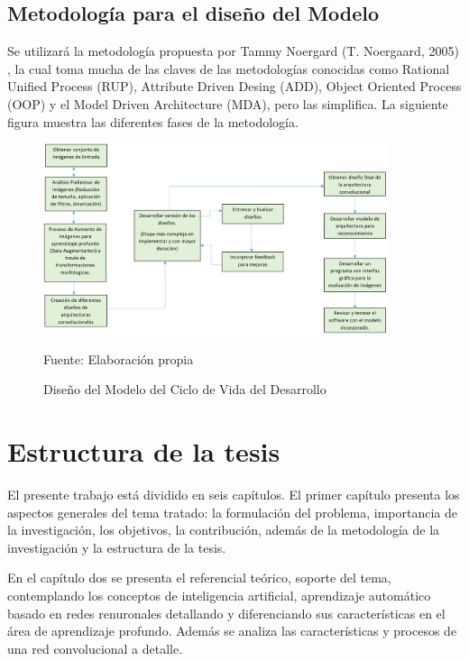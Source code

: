 		\subsection{Metodología para el diseño del Modelo}

			Se utilizará la metodología propuesta por Tammy Noergard (T. Noergaard, 2005) , la cual toma mucha de las claves de las metodologías conocidas como Rational Unified Process (RUP), Attribute Driven Desing (ADD), Object Oriented Process (OOP) y el Model Driven Architecture (MDA), pero las simplifica. La siguiente figura muestra las diferentes fases de la metodología.
			
			\begin{figure}[H]
			\begin{center}
			\includegraphics[width=0.9\textwidth]{images/intro/disenho}
			\end{center}
			\begin{center}
			\vskip 0.6cm	
			\caption{\small{Diseño del Modelo del Ciclo de Vida del Desarrollo}}
			{\small{Fuente: Elaboración propia}}
			\end{center}
			\vspace{-1.5em}
			\end{figure}


\section{Estructura de la tesis}

	\vskip 0.1cm
	El presente trabajo está dividido en seis capítulos. El primer capítulo presenta los aspectos generales del tema tratado: la formulación del problema, importancia de la investigación, los objetivos, la contribución, además de la metodología de la investigación y la estructura de la tesis.

	En el capítulo dos se presenta el referencial teórico, soporte del tema, contemplando los conceptos de inteligencia artificial, aprendizaje automático basado en redes renuronales detallando y diferenciando sus características en el área de aprendizaje profundo. Además se analiza las características y procesos de una red convolucional a detalle.

